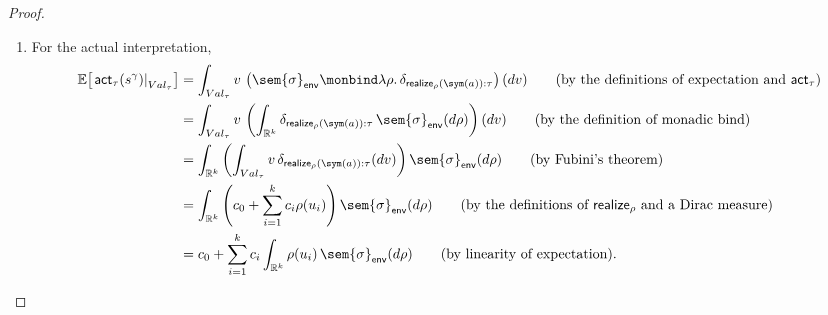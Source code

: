 \begin{proof}
\begin{enumerate}
    \item
    For the actual interpretation,
    \begin{align}
      \mathbb E\!\left[
        \left.\mathsf{act}_\tau(s^\gamma)\right|_{Val_\tau}
      \right]
      &=
      \int_{Val_\tau}
        v\,
        \left(
          \sem{\sigma}_{\mathsf{env}}
          \monbind
          \lambda\rho.\,
          \delta_{\mathsf{realize}_\rho(\sym(a)):\tau}
        \right)(dv)
      \tag{\text{by the definitions of expectation and $\mathsf{act}_\tau$}}
      \\
      &=
      \int_{Val_\tau}
        v\,
        \left(
          \int_{\mathbb R^k}
            \delta_{\mathsf{realize}_\rho(\sym(a)):\tau}
            \,\sem{\sigma}_{\mathsf{env}}(d\rho)
        \right)(dv)
      \tag{\text{by the definition of monadic bind}}
      \\
      &=
      \int_{\mathbb R^k}
        \left(
          \int_{Val_\tau}
            v\,
            \delta_{\mathsf{realize}_\rho(\sym(a)):\tau}(dv)
        \right)
        \sem{\sigma}_{\mathsf{env}}(d\rho)
      \tag{\text{by Fubini's theorem}}
      \\
      &=
      \int_{\mathbb R^k}
        \left(
          c_0+\sum_{i=1}^k c_i\rho(u_i)
        \right)
        \sem{\sigma}_{\mathsf{env}}(d\rho)
      \tag{\text{by the definitions of $\mathsf{realize}_\rho$ and a Dirac measure}}
      \\
      &=
      c_0+
      \sum_{i=1}^k
        c_i
        \int_{\mathbb R^k}
          \rho(u_i)\,
          \sem{\sigma}_{\mathsf{env}}(d\rho)
      \tag{\text{by linearity of expectation}}.
    \end{align}


\end{enumerate}
\end{proof}
